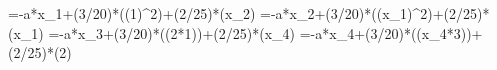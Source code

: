 =-a*x_1+(3/20)*\sin((1)^2)+(2/25)*\cos(x_2)
=-a*x_2+(3/20)*\sin((x_1)^2)+(2/25)*\cos(x_1)
=-a*x_3+(3/20)*\sin((2*1))+(2/25)*\cos(x_4)
=-a*x_4+(3/20)*\sin((x_4*3))+(2/25)*\cos(2)

